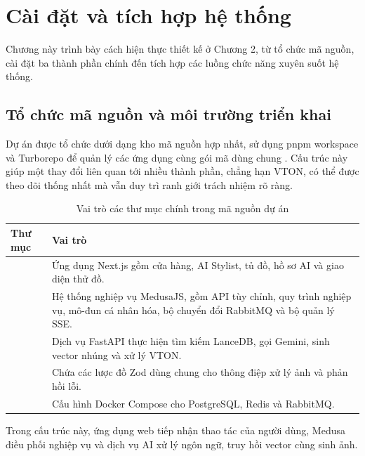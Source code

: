 \chapter{Cài đặt và tích hợp hệ thống}

Chương này trình bày cách hiện thực thiết kế ở Chương 2, từ tổ chức mã nguồn, cài đặt ba thành phần chính đến tích hợp các luồng chức năng xuyên suốt hệ thống.

\medskip

\section{Tổ chức mã nguồn và môi trường triển khai}

Dự án được tổ chức dưới dạng kho mã nguồn hợp nhất, sử dụng pnpm workspace và Turborepo để quản lý các ứng dụng cùng gói mã dùng chung \cite{pnpm,turborepo}. Cấu trúc này giúp một thay đổi liên quan tới nhiều thành phần, chẳng hạn VTON, có thể được theo dõi thống nhất mà vẫn duy trì ranh giới trách nhiệm rõ ràng.

\medskip

\begin{table}[H]
\centering
\caption{Vai trò các thư mục chính trong mã nguồn dự án}
\label{tab:source-directories}
\begin{tabularx}{\textwidth}{L{3.8cm}Y}
\toprule
\textbf{Thư mục} & \textbf{Vai trò} \\
\midrule
{} & Ứng dụng Next.js gồm cửa hàng, AI Stylist, tủ đồ, hồ sơ AI và giao diện thử đồ. \\
\addlinespace
{} & Hệ thống nghiệp vụ MedusaJS, gồm API tùy chỉnh, quy trình nghiệp vụ, mô-đun cá nhân hóa, bộ chuyển đổi RabbitMQ và bộ quản lý SSE. \\
\addlinespace
{} & Dịch vụ FastAPI thực hiện tìm kiếm LanceDB, gọi Gemini, sinh vector nhúng và xử lý VTON. \\
\addlinespace
{} & Chứa các lược đồ Zod dùng chung cho thông điệp xử lý ảnh và phản hồi lỗi. \\
\addlinespace
{} & Cấu hình Docker Compose cho PostgreSQL, Redis và RabbitMQ. \\
\bottomrule
\end{tabularx}
\end{table}



\medskip

Trong cấu trúc này, ứng dụng web tiếp nhận thao tác của người dùng, Medusa điều phối nghiệp vụ và dịch vụ AI xử lý ngôn ngữ, truy hồi vector cùng sinh ảnh.

